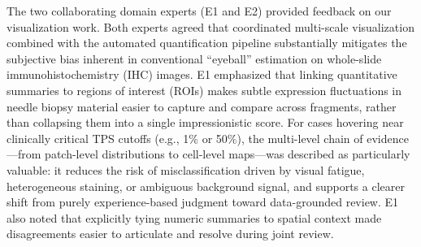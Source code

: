 \documentclass[journal]{vgtc}                     %
\begin{document}
The two collaborating domain experts (E1 and E2) provided feedback on our visualization work. Both experts agreed that coordinated multi-scale visualization combined with the automated quantification pipeline substantially mitigates the subjective bias inherent in conventional ``eyeball'' estimation on whole-slide immunohistochemistry (IHC) images. E1 emphasized that linking quantitative summaries to regions of interest (ROIs) makes subtle expression fluctuations in needle biopsy material easier to capture and compare across fragments, rather than collapsing them into a single impressionistic score. For cases hovering near clinically critical TPS cutoffs (e.g., 1\% or 50\%), the multi-level chain of evidence---from patch-level distributions to cell-level maps---was described as particularly valuable: it reduces the risk of misclassification driven by visual fatigue, heterogeneous staining, or ambiguous background signal, and supports a clearer shift from purely experience-based judgment toward data-grounded review. E1 also noted that explicitly tying numeric summaries to spatial context made disagreements easier to articulate and resolve during joint review.
\end{document}
